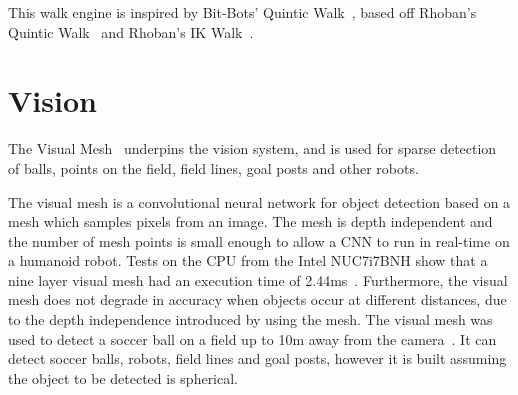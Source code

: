 \documentclass{llncs}
\begin{document}
This walk engine is inspired by Bit-Bots' Quintic Walk~\cite{bitbotsMotionGit}, based off Rhoban's Quintic Walk~\cite{rhobanModelGit} and Rhoban's IK Walk~\cite{rhobanModelGit}. 


\section{Vision}



\medskip

The Visual Mesh~\cite{Houliston2018VisualMR} underpins the vision system, and is used for sparse detection of balls, points on the field, field lines, goal posts and other robots.

The visual mesh is a convolutional neural network for object detection based on a mesh which samples pixels from an image. The mesh is depth independent and the number of mesh points is small enough to allow a CNN to run in real-time on a humanoid robot. Tests on the CPU from the Intel\textsuperscript{\textregistered} NUC7i7BNH show that a nine layer visual mesh had an execution time of 2.44ms~\cite{Houliston2018VisualMR}. Furthermore, the visual mesh does not degrade in accuracy when objects occur at different distances, due to the depth independence introduced by using the mesh. The visual mesh was used to detect a soccer ball on a field up to 10m away from the camera~\cite{Houliston2018VisualMR}. It can detect soccer balls, robots, field lines and goal posts, however it is built assuming the object to be detected is spherical.
\end{document}
